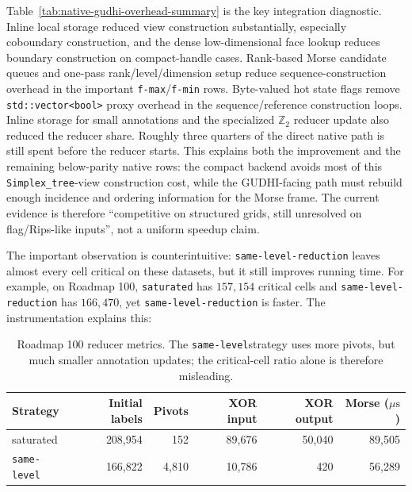 \documentclass[11pt]{article}
\newcommand{\us}{\ensuremath{\mu\mathrm{s}}}
\newcommand{\slred}{\texttt{same-level}}
\begin{document}






Table~\ref{tab:native-gudhi-overhead-summary} is the key integration diagnostic.  Inline
local storage reduced view construction substantially, especially coboundary construction,
and the dense low-dimensional face lookup reduces boundary construction on compact-handle
cases.  Rank-based Morse candidate queues and one-pass rank/level/dimension setup reduce
sequence-construction overhead in the important \texttt{f-max}/\texttt{f-min} rows.
Byte-valued hot state flags remove \texttt{std::vector<bool>} proxy overhead in the
sequence/reference construction loops.
Inline storage for small annotations and the specialized \(\mathbb{Z}_2\) reducer update
also reduced the reducer share.  Roughly three quarters of the direct native path is
still spent before the reducer starts.
This explains both the improvement and the remaining below-parity native rows: the compact
backend avoids most of this \texttt{Simplex\_tree}-view construction cost, while the
GUDHI-facing path must rebuild enough incidence and ordering information for the Morse
frame.  The current evidence is therefore ``competitive on structured grids, still
unresolved on flag/Rips-like inputs'', not a uniform speedup claim.

The important observation is counterintuitive: \texttt{same-level-reduction} leaves almost every
cell critical on these datasets, but it still improves running time.  For example, on
Roadmap 100, \texttt{saturated} has $157{,}154$ critical cells and \texttt{same-level-reduction} has
$166{,}470$, yet \texttt{same-level-reduction} is faster.  The instrumentation explains this:

\begin{table}[ht]
\centering
\small
\begin{tabular}{lrrrrr}
\toprule
Strategy & Initial labels & Pivots & XOR input & XOR output & Morse (\us) \\
\midrule
saturated   & 208,954 & 152   & 89,676 & 50,040 & 89,505 \\
\slred & 166,822 & 4,810 & 10,786 & 420    & 56,289 \\
\bottomrule
\end{tabular}
\caption{Roadmap 100 reducer metrics.  The \slred strategy uses more pivots, but much
smaller annotation updates; the critical-cell ratio alone is therefore misleading.}
\label{tab:roadmap100-metrics}
\end{table}
\end{document}
